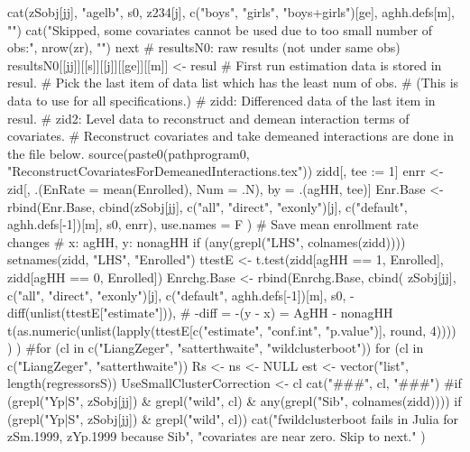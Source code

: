 \begin{Schunk}
\begin{Sinput}
{{{{{{{{                cat(zSobj[jj], "agelb", s0, z234[j], c("boys", "girls", "boys+girls")[ge], 
                  aghh.defs[m], "\n")
                cat("Skipped, some covariates cannot be used due to too small number of obs:", nrow(zr), "\n\n")
                next
              }
              # resultsN0: raw results (not under same obs)
              resultsN0[[jj]][[s]][[j]][[ge]][[m]] <- resul
              # First run estimation data is stored in resul.
              # Pick the last item of data list which has the least num of obs. 
              # (This is data to use for all specifications.)
              # zidd: Differenced data of the last item in resul.
              # zid2: Level data to reconstruct and demean interaction terms of covariates.
                # Reconstruct covariates and take demeaned interactions are done in the file below.
                source(paste0(pathprogram0, "ReconstructCovariatesForDemeanedInteractions.tex"))
              zidd[, tee := 1]
              enrr <- zid[, .(EnRate = mean(Enrolled), Num = .N), by = .(agHH, tee)]
              Enr.Base <- rbind(Enr.Base, 
                cbind(zSobj[jj], c("all", "direct", "exonly")[j], c("default", aghh.defs[-1])[m], 
                  s0, enrr),
                use.names = F
              )
              # Save mean enrollment rate changes
              # x: agHH, y: nonagHH
              if (any(grepl("LHS", colnames(zidd)))) setnames(zidd, "LHS", "Enrolled")
              ttestE <- t.test(zidd[agHH == 1, Enrolled], zidd[agHH == 0, Enrolled])
              Enrchg.Base <- rbind(Enrchg.Base, 
                cbind(
                    zSobj[jj], c("all", "direct", "exonly")[j], c("default", aghh.defs[-1])[m], 
                    s0, -diff(unlist(ttestE["estimate"])), # -diff = -(y - x) = AgHH - nonagHH
                    t(as.numeric(unlist(lapply(ttestE[c("estimate", "conf.int", "p.value")], round, 4))))
                    )
                  )
              #for (cl in c("LiangZeger", "satterthwaite", "wildclusterboot")) 
              for (cl in c("LiangZeger", "satterthwaite")) 
              {
                Rs <- ns <- NULL
                est <- vector("list", length(regressorsS))
                UseSmallClusterCorrection <- cl
                cat("\n\n###", cl, "###\n\n")
                #if (grepl("Yp|S", zSobj[jj]) & grepl("wild", cl) & any(grepl("Sib", colnames(zidd)))) {
                if (grepl("Yp|S", zSobj[jj]) & grepl("wild", cl)) {
                  cat("fwildclusterboot fails in Julia for zSm.1999, zYp.1999 because Sib", 
                    "covariates are near zero. Skip to next.\n\n" )
}}}}}}}}}}
\end{Sinput}
\end{Schunk}
